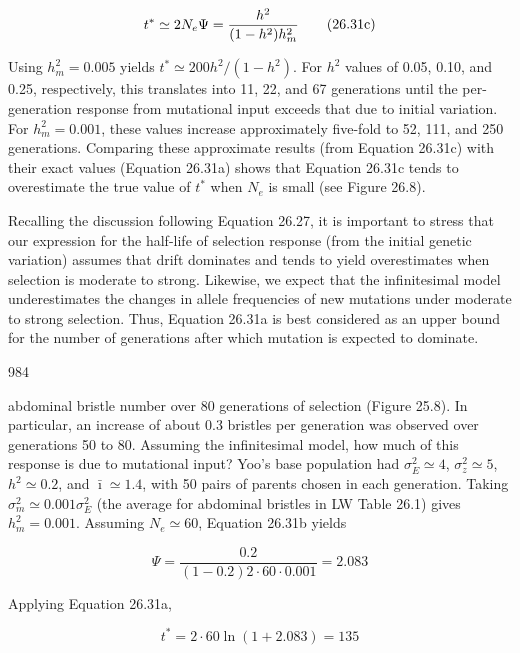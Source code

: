 \documentclass{article}
\begin{document}
{\begin{equation}
\begin{align*}t^*\simeq2N_e\Psi={h^2\over(1-h^2)h_m^2}\end{align*}
\tag{26.31c}
\label{eq:26_31c}
\end{equation}

Using  $ h_m^2 = 0.005 $ yields  $ t^* \simeq 200h^2/(1 - h^2) $. For  $ h^2 $ values of 0.05, 0.10, and 0.25, respectively, this translates into 11, 22, and 67 generations until the per-generation response from mutational input exceeds that due to initial variation. For  $ h_m^2 = 0.001 $, these values increase approximately five-fold to 52, 111, and 250 generations. Comparing these approximate results (from Equation 26.31c) with their exact values (Equation 26.31a) shows that Equation 26.31c tends to overestimate the true value of  $ t^* $ when  $ N_e $ is small (see Figure 26.8).

Recalling the discussion following Equation 26.27, it is important to stress that our expression for the half-life of selection response (from the initial genetic variation) assumes that drift dominates and tends to yield overestimates when selection is moderate to strong. Likewise, we expect that the infinitesimal model underestimates the changes in allele frequencies of new mutations under moderate to strong selection. Thus, Equation 26.31a is best considered as an upper bound for the number of generations after which mutation is expected to dominate.

984

abdominal bristle number over 80 generations of selection (Figure 25.8). In particular, an increase of about 0.3 bristles per generation was observed over generations 50 to 80. Assuming the infinitesimal model, how much of this response is due to mutational input? Yoo's base population had  $ \sigma_E^2 \simeq 4 $,  $ \sigma_z^2 \simeq 5 $,  $ h^2 \simeq 0.2 $, and  $ \bar{\imath} \simeq 1.4 $, with 50 pairs of parents chosen in each generation. Taking  $ \sigma_m^2 \simeq 0.001\sigma_E^2 $ (the average for abdominal bristles in LW Table 26.1) gives  $ h_m^2 = 0.001 $. Assuming  $ N_e \simeq 60 $, Equation 26.31b yields

\begin{equation}
\Psi=\frac{0.2}{\left(1-0.2\right)2\cdot60\cdot0.001}=2.083
\end{equation}

Applying Equation 26.31a,

\begin{equation}
t^{*}=2\cdot60\ln(1+2.083)=135
\end{equation}

}
\end{document}

